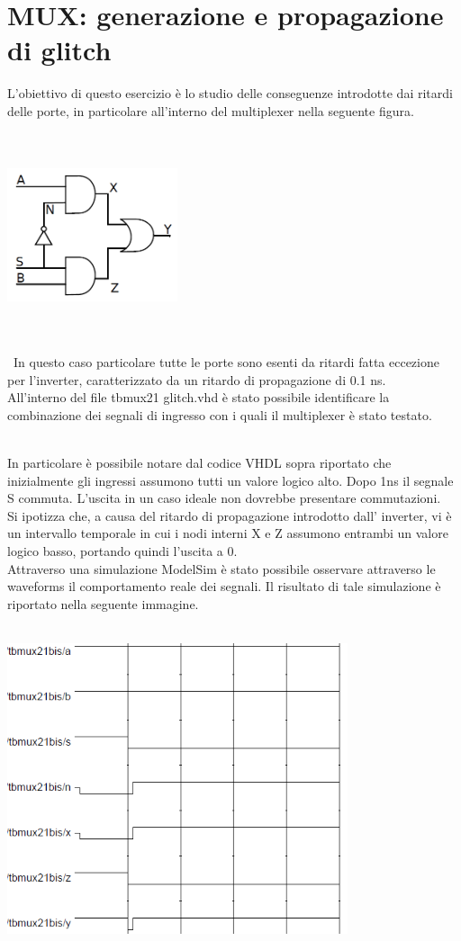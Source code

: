 \documentclass[10pt,  english, makeidx, a4paper, titlepage, oneside]{book}
\newenvironment{listato}{\footnotesize}
                        {\normalsize }
\begin{document}
\section{MUX: generazione e propagazione di glitch}
L'obiettivo di questo esercizio è lo studio delle conseguenze 
introdotte dai ritardi delle porte, in particolare all'interno del
multiplexer nella seguente figura.
\\\\\
\centerline{\includegraphics[width=5cm]{./img/Lab_1/Es_4/Mux.png}}
\\\\\
In questo caso particolare tutte le porte sono esenti da ritardi fatta
eccezione per l'inverter, caratterizzato da un ritardo di propagazione
di 0.1 ns.
\\
All'interno del file tb\textunderscore mux21\textunderscore
glitch.vhd è stato possibile identificare la combinazione 
dei segnali di ingresso con i quali il multiplexer è stato
testato.
\\\\
\begin{listato}
	
\end{listato}
In particolare è possibile notare dal codice VHDL sopra riportato
che inizialmente gli ingressi assumono tutti un valore logico alto.
Dopo 1ns il segnale S commuta. L'uscita in un caso ideale non dovrebbe
presentare commutazioni.
\\
Si ipotizza che, a causa del ritardo di propagazione introdotto dall'
inverter, vi è un intervallo temporale in cui i nodi interni X e Z 
assumono entrambi un valore logico basso, portando quindi l'uscita a 0.
\\
Attraverso una simulazione ModelSim è stato possibile osservare
attraverso le waveforms il comportamento reale dei segnali. Il risultato
di tale simulazione è riportato nella seguente immagine.
\\\\
\centerline{\includegraphics[width=10cm]{./img/Lab_1/Es_4/Glitch.png}}
\end{document}
